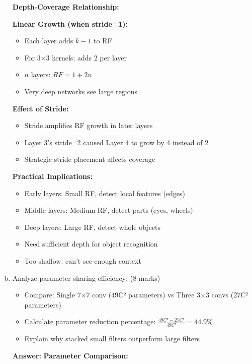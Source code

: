 \documentclass[12pt]{article}
\newcommand{\answer}[1]{{\color{answercolor}\textbf{Answer:} #1}}
\newcommand{\explanation}[1]{{\color{explanationcolor}#1}}
\begin{document}
\begin{enumerate}[(a)]
{    \textbf{Depth-Coverage Relationship:}
    
    \explanation{
    \textbf{Linear Growth (when stride=1):}
    \begin{itemize}
        \item Each layer adds $k-1$ to RF
        \item For 3×3 kernels: adds 2 per layer
        \item $n$ layers: $RF = 1 + 2n$
        \item Very deep networks see large regions
    \end{itemize}
    
    \textbf{Effect of Stride:}
    \begin{itemize}
        \item Stride amplifies RF growth in later layers
        \item Layer 3's stride=2 caused Layer 4 to grow by 4 instead of 2
        \item Strategic stride placement affects coverage
    \end{itemize}
    
    \textbf{Practical Implications:}
    \begin{itemize}
        \item Early layers: Small RF, detect local features (edges)
        \item Middle layers: Medium RF, detect parts (eyes, wheels)
        \item Deep layers: Large RF, detect whole objects
        \item Need sufficient depth for object recognition
        \item Too shallow: can't see enough context
    \end{itemize}
    }
    }
    
    \item Analyze parameter sharing efficiency: \hfill (8 marks)
    \begin{itemize}
        \item Compare: Single 7×7 conv (49C² parameters) vs Three 3×3 convs (27C² parameters)  
        \item Calculate parameter reduction percentage: $\frac{49C² - 27C²}{49C²} = 44.9\%$
        \item Explain why stacked small filters outperform large filters
    \end{itemize}
    
    \answer{
    \textbf{Parameter Comparison:}
    
}
\end{enumerate}
\end{document}
